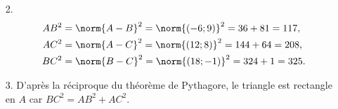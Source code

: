 {	\begin{enumerate}
		\item[2.] 
			\begin{align*}
				AB^2 &= \norm{A-B}^2 = \norm{(-6 ; 9)}^2 = 36 + 81 = 117, \\
				AC^2 &= \norm{A-C}^2 = \norm{(12 ; 8)}^2 = 144 + 64 = 208, \\
				BC^2 &= \norm{B-C}^2 = \norm{(18 ; -1)}^2 = 324 + 1 = 325.
			\end{align*}
		\item[3.] D'après la réciproque du théorème de Pythagore, le triangle est rectangle en $A$ car $BC^2 = AB^2 + AC^2$.
	\end{enumerate}
}